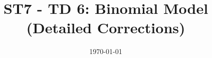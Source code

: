 \documentclass{article}
\begin{document}
\title{ST7 - TD 6: Binomial Model (Detailed Corrections)}
\author{}
\date{\today}

\maketitle




\newpage


\newpage


\end{document}
